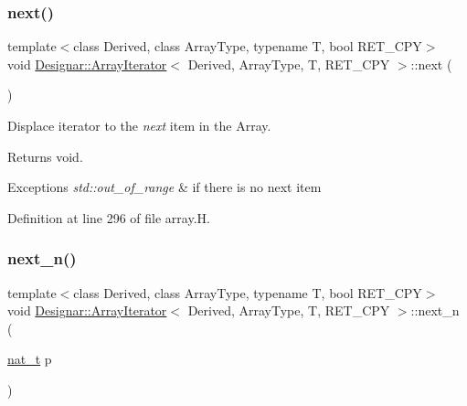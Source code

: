 \mbox{\label{class_designar_1_1_array_iterator_ac4e929d3247b68c3c9cffb43ec0891ec}} 
\subsubsection{\texorpdfstring{next()}{next()}}
{\footnotesize\ttfamily template$<$class Derived, class Array\+Type, typename T, bool R\+E\+T\+\_\+\+C\+PY$>$ \\
void \hyperlink{class_designar_1_1_array_iterator}{Designar\+::\+Array\+Iterator}$<$ Derived, Array\+Type, T, R\+E\+T\+\_\+\+C\+PY $>$\+::next (\begin{DoxyParamCaption}{ }\end{DoxyParamCaption})\hspace{0.3cm}{\ttfamily [inline]}}



Displace iterator to the {\itshape next} item in the Array. 

\begin{DoxyReturn}{Returns}
void. 
\end{DoxyReturn}

\begin{DoxyExceptions}{Exceptions}
{\em std\+::out\+\_\+of\+\_\+range} & if there is no next item \\
\hline
\end{DoxyExceptions}


Definition at line 296 of file array.\+H.

\mbox{\label{class_designar_1_1_array_iterator_a8709128b09b8b177fa1b042cb330c3e5}} 
\subsubsection{\texorpdfstring{next\+\_\+n()}{next\_n()}}
{\footnotesize\ttfamily template$<$class Derived, class Array\+Type, typename T, bool R\+E\+T\+\_\+\+C\+PY$>$ \\
void \hyperlink{class_designar_1_1_array_iterator}{Designar\+::\+Array\+Iterator}$<$ Derived, Array\+Type, T, R\+E\+T\+\_\+\+C\+PY $>$\+::next\+\_\+n (\begin{DoxyParamCaption}\item[{\hyperlink{namespace_designar_aa72662848b9f4815e7bf31a7cf3e33d1}{nat\+\_\+t}}]{p }\end{DoxyParamCaption})\hspace{0.3cm}{\ttfamily [inline]}}



